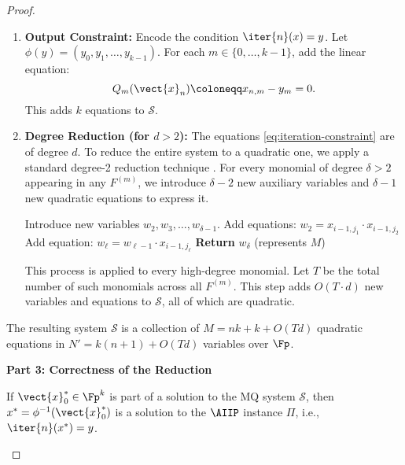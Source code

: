\begin{proof}
\begin{definition}
\begin{enumerate}
                        \item \textbf{Output Constraint:} Encode the condition $\iter{n}(x) = y$. Let $\phi(y) = (y_0, y_1, \ldots, y_{k-1})$. For each $m \in \{0, \ldots, k-1\}$, add the linear equation:
                        \begin{equation}
                            Q_m(\vect{x}_n) \coloneqq x_{n,m} - y_m = 0.
                        \end{equation}
                        This adds $k$ equations to $\mathcal{S}$.
                        \item \textbf{Degree Reduction (for $d > 2$):} The equations \eqref{eq:iteration-constraint} are of degree $d$. To reduce the entire system to a quadratic one, we apply a standard degree-2 reduction technique \cite{Courtois2000}. For every monomial of degree $\delta > 2$ appearing in any $F^{(m)}$, we introduce $\delta - 2$ new auxiliary variables and $\delta - 1$ new quadratic equations to express it.
                        \begin{algorithmic}[1]
                            \State Introduce new variables $w_2, w_3, \ldots, w_{\delta-1}$.
                            \State Add equations: $w_2 = x_{i-1, j_1} \cdot x_{i-1, j_2}$
                                \State Add equation: $w_{\ell} = w_{\ell-1} \cdot x_{i-1, j_{\ell}}$
                            \EndFor
                            \State \textbf{Return} $w_{\delta}$ (represents $M$)
                            \EndProcedure
                        \end{algorithmic}
                        This process is applied to every high-degree monomial. Let $T$ be the total number of such monomials across all $F^{(m)}$. This step adds $O(T \cdot d)$ new variables and equations to $\mathcal{S}$, all of which are quadratic.
                    \end{enumerate}
                    The resulting system $\mathcal{S}$ is a collection of $M = nk + k + O(Td)$ quadratic equations in $N' = k(n+1) + O(Td)$ variables over $\Fp$.
                \end{definition}
            \textbf{Part 3: Correctness of the Reduction}
                \begin{claim}\label{claim:correctness1}
                    If $\vect{x}_0^* \in \Fp^k$ is part of a solution to the MQ system $\mathcal{S}$, then $x^* = \phi^{-1}(\vect{x}_0^*)$ is a solution to the $\AIIP$ instance $\Pi$, i.e., $\iter{n}(x^*) = y$.

\end{claim}
\end{proof}
